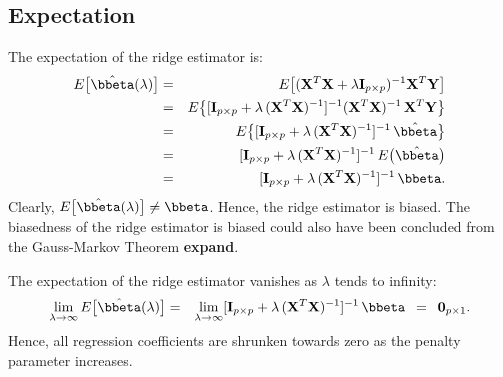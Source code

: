 \documentclass[a4paper]{article}
\theoremstyle{myexamplestyle}
\def\reminder#1{\marginpar{\rule[0pt]{1mm}{11pt}}\textbf{#1}}
\begin{document}
\subsection{Expectation}
The expectation of the ridge estimator is:
\begin{eqnarray*}
E \big[ \hat{\bbeta}(\lambda) \big] & = & E \big[ (\mathbf{X}^T \mathbf{X} + \lambda \mathbf{I}_{p \times p})^{-1} \mathbf{X}^T \mathbf{Y} \big]
\\
& = & E \big\{ [ \mathbf{I}_{p \times p} + \lambda \, (\mathbf{X}^T \mathbf{X})^{-1}]^{-1} (\mathbf{X}^T \mathbf{X})^{-1} \, \mathbf{X}^T \mathbf{Y} \big\}
\\
& = & E \big\{ [\mathbf{I}_{p \times p} + \lambda \, (\mathbf{X}^T \mathbf{X})^{-1} ]^{-1} \, \hat{\bbeta} \big\}
\\
& = & [\mathbf{I}_{p \times p} + \lambda \, (\mathbf{X}^T \mathbf{X})^{-1} ]^{-1} \, E \big(\hat{\bbeta} \big)
\\
& = & [\mathbf{I}_{p \times p} + \lambda \, (\mathbf{X}^T \mathbf{X})^{-1} ]^{-1} \, \bbeta.
\end{eqnarray*}
Clearly, $E \big[ \hat{\bbeta}(\lambda) \big] \not= \bbeta$. Hence, the ridge estimator is biased. The biasedness of the ridge estimator is biased could also have been concluded from the Gauss-Markov Theorem \reminder{expand}.

The expectation of the ridge estimator vanishes as $\lambda$ tends to infinity:
\begin{eqnarray*}
\lim_{\lambda \rightarrow \infty} E \big[ \hat{\bbeta}(\lambda) \big] & = & \lim_{\lambda \rightarrow \infty}  [\mathbf{I}_{p \times p} + \lambda \, (\mathbf{X}^T \mathbf{X})^{-1} ]^{-1} \, \bbeta \, \, \, = \, \, \, \mathbf{0}_{p \times 1}.
\end{eqnarray*}
Hence, all regression coefficients are shrunken towards zero as the penalty parameter increases.
\end{document}
